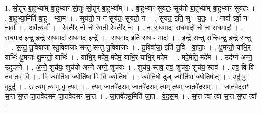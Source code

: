 \documentclass[17pt]{extarticle}
\begin{document}
1. सो॒तुर् बा॒हुभ्या᳚म् बा॒हुभ्याꣳ॑ सो॒तुः सो॒तुर् बा॒हुभ्या᳚म् । . बा॒हुभ्याꣳ॒॒ सुय॑तः॒ सुय॑तो बा॒हुभ्या᳚म् बा॒हुभ्याꣳ॒॒ सुय॑तः । . बा॒हुभ्या॒मिति॑ बा॒हु - भ्या॒म् । . सुय॑तो॒ न न सुय॑तः॒ सुय॑तो॒ न । . सुय॑त॒ इति॒ सु - य॒तः॒ । . नार्वा ऽर्वा॒ न नार्वा᳚ । . अर्वेत्यर्वा᳚ । . रे॒वती᳚र् नो नो रे॒वती॑ रे॒वती᳚र् नः । . नः॒ स॒ध॒मादः॑ सध॒मादो॑ नो नः सध॒मादः॑ । . स॒ध॒माद॒ इन्द्र॒ इन्द्रे॑ सध॒मादः॑ सध॒माद॒ इन्द्रे᳚ । . स॒ध॒माद॒ इति॑ सध - मादः॑ । . इन्द्रे॑ सन्तु स॒न्त्विन्द्र॒ इन्द्रे॑ सन्तु । . स॒न्तु॒ तु॒विवा॑जा स्तु॒विवा॑जाः सन्तु सन्तु तु॒विवा॑जाः । . तु॒विवा॑जा॒ इति॑ तु॒वि - वा॒जाः॒ । . क्षु॒मन्तो॒ याभि॒र् याभिः॑ क्षु॒मन्तः॑ क्षु॒मन्तो॒ याभिः॑ । . याभि॒र् मदे॑म॒ मदे॑म॒ याभि॒र् याभि॒र् मदे॑म । . मदे॒मेति॒ मदे॑म । . उद॑ग्ने अग्न॒ उदुद॑ग्ने । . अ॒ग्ने॒ शुच॑यः॒ शुच॑यो अग्ने अग्ने॒ शुच॑यः । . शुच॑य॒ स्तव॒ तव॒ शुच॑यः॒ शुच॑य॒ स्तव॑ । . तव॒ वि वि तव॒ तव॒ वि । . वि ज्योति॑षा॒ ज्योति॑षा॒ वि वि ज्योति॑षा । . ज्योति॒षो दुज् ज्योति॑षा॒ ज्योति॒षोत् । . उदु॑ वु॒ वुदुदु॑ । . उ॒ त्यम् त्य मु॑ वु॒ त्यम् । . त्यम् जा॒तवे॑दसम् जा॒तवे॑दस॒म् त्यम् त्यम् जा॒तवे॑दसम् । . जा॒तवे॑दसꣳ स॒प्त स॒प्त जा॒तवे॑दसम् जा॒तवे॑दसꣳ स॒प्त । . जा॒तवे॑दस॒मिति॑ जा॒त - वे॒द॒स॒म् । . स॒प्त त्वा᳚ त्वा स॒प्त स॒प्त त्वा᳚ । \newline
\end{document}
